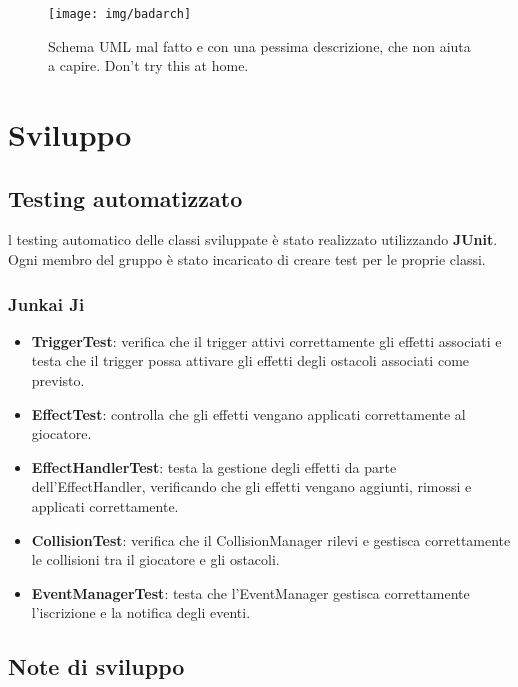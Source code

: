 \documentclass[a4paper,12pt]{report}
\begin{document}
	
	\begin{figure}[h]
		\centering{}
		\texttt{[image: img/badarch]}
		\caption{Schema UML mal fatto e con una pessima descrizione, che non aiuta a capire. Don't try this at home.}
		\label{img:badarch}
	\end{figure}
	
\chapter{Sviluppo}
\section{Testing automatizzato}

l testing automatico delle classi sviluppate è stato realizzato utilizzando \textbf{JUnit}. Ogni membro del gruppo è stato incaricato di creare test per le proprie classi.

\subsection{Junkai Ji}
\begin{itemize}
\item \textbf{TriggerTest}: verifica che il trigger attivi correttamente gli effetti associati e testa che il trigger possa attivare gli effetti degli ostacoli associati come previsto.

\item \textbf{EffectTest}: controlla che gli effetti vengano applicati correttamente al giocatore.

\item \textbf{EffectHandlerTest}: testa la gestione degli effetti da parte dell’EffectHandler, verificando che gli effetti vengano aggiunti, rimossi e applicati correttamente.

\item \textbf{CollisionTest}: verifica che il CollisionManager rilevi e gestisca correttamente le collisioni tra il giocatore e gli ostacoli.

\item \textbf{EventManagerTest}: testa che l’EventManager gestisca correttamente l’iscrizione e la notifica degli eventi.
\end{itemize}


\section{Note di sviluppo}
\end{document}
